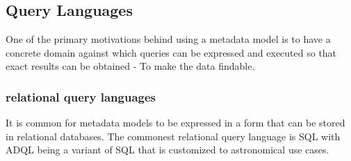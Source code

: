 \subsection{Query Languages}

One of the primary motivations behind using a metadata model is to have a concrete domain against which queries can be expressed and executed so that exact results can be obtained - To make the data findable.

\subsubsection{relational query languages}
It is common for metadata models to be expressed in a form that can be stored in relational databases. The commonest relational query language is SQL with ADQL being a variant of SQL that is customized to astronomical use cases.


